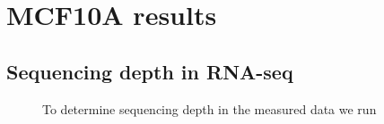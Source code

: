 \chapter{MCF10A results}
\label{cha:mcf10a-results}

\section{Sequencing depth in RNA-seq}
\label{sec:sequencing-depth-rna}



\begin{figure}
  \centering
  \caption{To determine sequencing depth in the measured data we run}
  \label{fig:seq-depth}
\end{figure}

